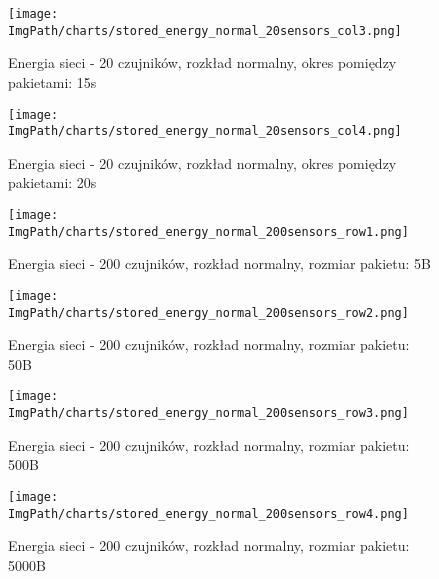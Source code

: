 \documentclass[a4paper,12pt,twoside,openany]{report}
\newcommand{\ImgPath}{./img}
\begin{document}
\begin{figure}[H]
	\begin{center}
		\texttt{[image: \\ImgPath/charts/stored\_energy\_normal\_20sensors\_col3.png]}
	\end{center}
	\caption{Energia sieci - 20 czujników, rozkład normalny, okres pomiędzy pakietami: 15s}
\end{figure}

\begin{figure}[H]
	\begin{center}
		\texttt{[image: \\ImgPath/charts/stored\_energy\_normal\_20sensors\_col4.png]}
	\end{center}
	\caption{Energia sieci - 20 czujników, rozkład normalny, okres pomiędzy pakietami: 20s}
\end{figure}

\begin{figure}[H]
	\begin{center}
		\texttt{[image: \\ImgPath/charts/stored\_energy\_normal\_200sensors\_row1.png]}
	\end{center}
	\caption{Energia sieci - 200 czujników, rozkład normalny, rozmiar pakietu: 5B}
\end{figure}

\begin{figure}[H]
	\begin{center}
		\texttt{[image: \\ImgPath/charts/stored\_energy\_normal\_200sensors\_row2.png]}
	\end{center}
	\caption{Energia sieci - 200 czujników, rozkład normalny, rozmiar pakietu: 50B}
\end{figure}

\begin{figure}[H]
	\begin{center}
		\texttt{[image: \\ImgPath/charts/stored\_energy\_normal\_200sensors\_row3.png]}
	\end{center}
	\caption{Energia sieci - 200 czujników, rozkład normalny, rozmiar pakietu: 500B}
\end{figure}

\begin{figure}[H]
	\begin{center}
		\texttt{[image: \\ImgPath/charts/stored\_energy\_normal\_200sensors\_row4.png]}
	\end{center}
	\caption{Energia sieci - 200 czujników, rozkład normalny, rozmiar pakietu: 5000B}
\end{figure}
\end{document}
